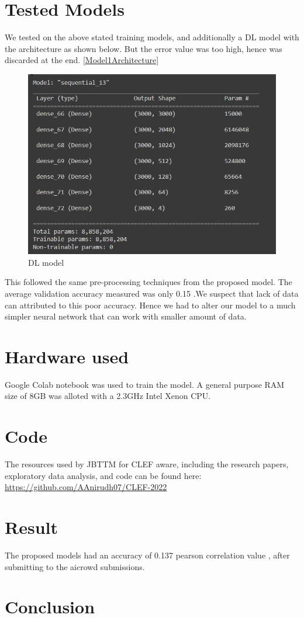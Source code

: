 \documentclass{llncs}
\begin{document}
\section{Tested Models}
We tested on the above stated training models, and additionally a DL model with the architecture as shown below. But the error value was too high, hence was discarded at the end.
 \ref{Model1Architecture}
\begin{center}
\begin{figure}[h]
    \centering
    \includegraphics[width=\textwidth,height=\textheight,keepaspectratio]{DL_model.png}
    \caption{DL model}
    \label{fig:Randomforest}
\end{figure}
\end{center}

This followed the same pre-processing techniques from the proposed model. The average validation accuracy measured was only 0.15 .We suspect that lack of data can attributed to this poor accuracy. Hence we had to alter our model to a much simpler neural network that can work with smaller amount of data. 


\section{Hardware used}
Google Colab notebook was used to train the model. A general purpose RAM 
size of 8GB was alloted with a 2.3GHz Intel Xenon CPU.


\section {Code}
The resources used by JBTTM for CLEF aware, including the research papers, exploratory data analysis, and code can be found here: \url{https://github.com/AAnirudh07/CLEF-2022}

\section{Result}
The proposed models had an accuracy of 0.137 pearson correlation value , after submitting to the aicrowd submissions. 

\section{Conclusion}
 



%


%
\end{document}
